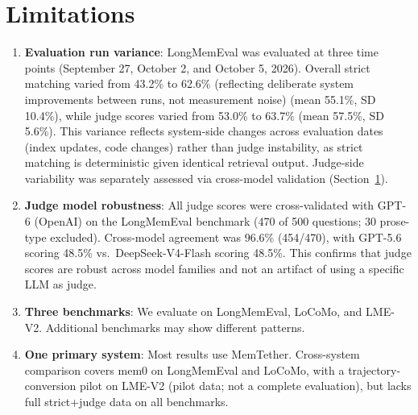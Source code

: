 \documentclass{article}
\begin{document}
\section{Limitations}
\label{sec:limitations}
\begin{enumerate}
\item \textbf{Evaluation run variance}: LongMemEval was evaluated at three time points (September 27, October 2, and October 5, 2026). Overall strict matching varied from 43.2\% to 62.6\% (reflecting deliberate system improvements between runs, not measurement noise) (mean 55.1\%, SD 10.4\%), while judge scores varied from 53.0\% to 63.7\% (mean 57.5\%, SD 5.6\%). This variance reflects system-side changes across evaluation dates (index updates, code changes) rather than judge instability, as strict matching is deterministic given identical retrieval output. Judge-side variability was separately assessed via cross-model validation (Section~\ref{sec:limitations}).
\item \textbf{Judge model robustness}: All judge scores were cross-validated with GPT-6 (OpenAI) on the LongMemEval benchmark (470 of 500 questions; 30 prose-type excluded). Cross-model agreement was 96.6\% (454/470), with GPT-5.6 scoring 48.5\% vs.\ DeepSeek-V4-Flash scoring 48.5\%. This confirms that judge scores are robust across model families and not an artifact of using a specific LLM as judge.
\item \textbf{Three benchmarks}: We evaluate on LongMemEval, LoCoMo, and LME-V2. Additional benchmarks may show different patterns.
\item \textbf{One primary system}: Most results use MemTether. Cross-system comparison covers mem0 on LongMemEval and LoCoMo, with a trajectory-conversion pilot on LME-V2 (pilot data; not a complete evaluation), but lacks full strict+judge data on all benchmarks.

\end{enumerate}
\end{document}
